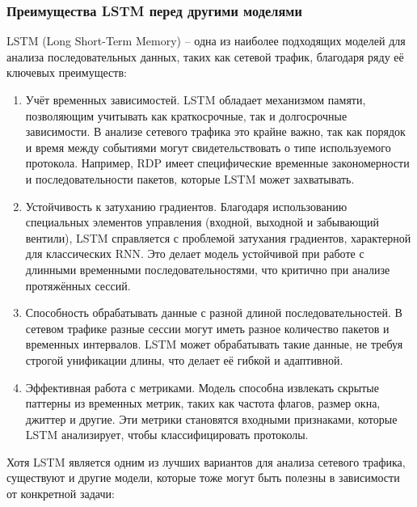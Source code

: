 \documentclass[bachelor, och, coursework]{SCWorks}
\begin{document}
\subsubsection{Преимущества LSTM перед другими моделями}

  LSTM (Long Short-Term Memory) -- одна из наиболее подходящих моделей для анализа последовательных данных, таких как 
  сетевой трафик, благодаря ряду её ключевых преимуществ: 

  \begin{enumerate}
    \item Учёт временных зависимостей. LSTM обладает механизмом памяти, позволяющим учитывать как краткосрочные, так и 
    долгосрочные зависимости. В анализе сетевого трафика это крайне важно, так как порядок и время между событиями могут 
    свидетельствовать о типе используемого протокола. Например, RDP имеет специфические временные закономерности и последовательности пакетов, 
    которые LSTM может захватывать.  

    \item Устойчивость к затуханию градиентов. Благодаря использованию специальных элементов управления (входной, выходной и забывающий вентили), 
    LSTM справляется с проблемой затухания градиентов, характерной для классических RNN. Это делает модель устойчивой при работе с длинными 
    временными последовательностями, что критично при анализе протяжённых сессий.  

    \item Способность обрабатывать данные с разной длиной последовательностей. В сетевом трафике разные сессии могут иметь разное количество
    пакетов и временных интервалов. LSTM может обрабатывать такие данные, не требуя строгой унификации длины, что делает её гибкой и адаптивной.  

    \item Эффективная работа с метриками. Модель способна извлекать скрытые паттерны из временных метрик, таких как частота флагов, 
    размер окна, джиттер и другие. Эти метрики становятся входными признаками, которые LSTM анализирует, чтобы классифицировать протоколы.  

  \end{enumerate}

  Хотя LSTM является одним из лучших вариантов для анализа сетевого трафика, существуют и другие модели, которые тоже могут быть 
  полезны в зависимости от конкретной задачи:
\end{document}

